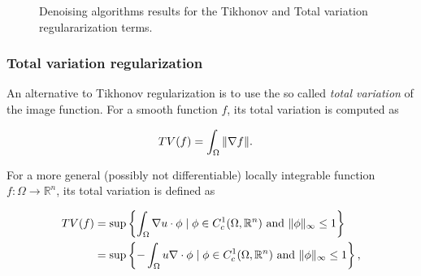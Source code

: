 \begin{figure}
{}%
%
\caption{Denoising algorithms results for the Tikhonov and Total variation regulararization terms.}
\label{ch1:fig:denoising-results}
\end{figure}


\subsubsection{Total variation regularization}
An alternative to Tikhonov regularization is to use the so called \emph{total variation} of the image function. For a smooth function $f$, its total variation is computed as

\begin{align*}
	TV(f) &= \int_{\Omega}{ \lVert \nabla f \rVert }.
\end{align*}

For a more general (possibly not differentiable) locally integrable function $f:\Omega \rightarrow \mathbb{R}^n$, its total variation is defined as

\begin{align*}
	TV(f) &= \sup \left\{ \int_{\Omega}{\nabla u \cdot \phi} \; | \; \phi \in C_c^{1}(\Omega, \mathbb{R}^n) \text{ and } \lVert\phi\rVert_{\infty} \leq 1 \right\} \\
		  &= \sup \left\{ - \int_{\Omega}{u \nabla \cdot \phi} \; | \; \phi \in C_c^{1}(\Omega, \mathbb{R}^n) \text{ and } \lVert\phi\rVert_{\infty} \leq 1 \right\},	
\end{align*}

